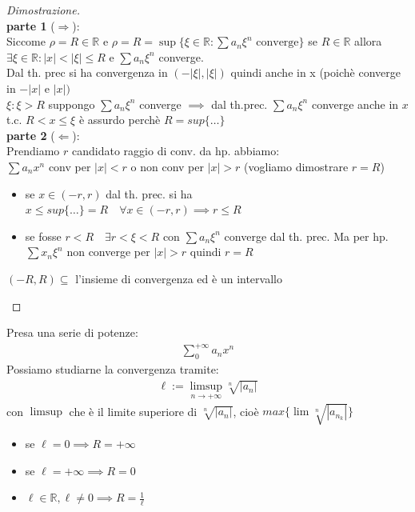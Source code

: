 \documentclass[a4paper, oneside]{article}
\newcommand\R{\mathbb{R}}
\begin{document}
\begin{proof}[Dimostrazione]\hfill\\
  \textbf{parte 1} ($\Rightarrow$):\\
  Siccome $\rho = R \in \R$ e $\rho = R = \sup \{ \xi \in \R : \sum a_n \xi^n \text{ converge} \}$ se $R \in \R$ allora 
  $\exists \xi \in \mathbb{R}: |x| < |\xi| \leq R$ e $\sum a_n \xi^n $ converge.\\
  Dal th. prec si ha convergenza in $(-|\xi|, |\xi|)$ quindi anche in x (poichè converge in $-|x|$ e  $|x|)$\\
   $\xi: \xi > R$
  suppongo $\sum a_n \xi^n $ converge $\implies$ dal th.prec. $\sum a_n \xi^n$ converge anche in $x$ t.c. $R < x \leq \xi$ è assurdo perchè $R = sup \{\dots\}$\\

  \noindent\textbf{parte 2} ($\Leftarrow$):\\
  Prendiamo $r$ candidato raggio di conv. da hp. abbiamo:\\
  $\sum a_n x^n $ conv per $|x| < r$ o non conv per $|x| > r$ (vogliamo dimostrare $r = R$)\\
  \begin{itemize}
    \item se $x \in (-r, r)$ dal th. prec. si ha $x \leq sup \{\dots\} = R \quad \forall x \in (-r,r) \implies r \leq R$
    \item se fosse $r < R \quad \exists r < \xi < R$ con $\sum a_n \xi^n$ converge dal th. prec.
    Ma per hp. $\sum x_n \xi^n$ non converge per $|x| > r$ quindi $r = R$
  \end{itemize}
  \begin{observation}
    $(-R,R) \subseteq$ l'insieme di convergenza ed è un intervallo
  \end{observation}
\end{proof}


\begin{theorem}
  Presa una serie di potenze:
  \begin{gather*}
    \sum_{0}^{+\infty} a_n x^n
  \end{gather*}
  Possiamo studiarne la convergenza tramite:
  \begin{gather*}
    \ell := \limsup_{n \to +\infty} \sqrt[n]{|a_n|}
  \end{gather*}
  con $\limsup$ che è il limite superiore di $\sqrt[n]{|a_n|}$, cioè $max \{ \lim \sqrt[n]{|a_{n_k}|} \}$\\
  \begin{itemize}
    \item se $\ell = 0 \implies R = +\infty$
    \item se $\ell = +\infty \implies R = 0$
    \item $\ell \in \R, \ell \neq 0 \implies R = \frac{1}{\ell}$
  \end{itemize}
\end{theorem}
\end{document}
